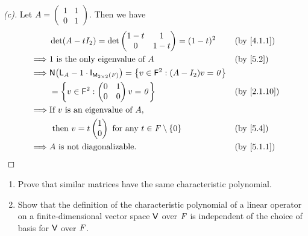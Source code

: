 \begin{proof}[(c)]
  Let \(A = \begin{pmatrix}
    1 & 1 \\
    0 & 1
  \end{pmatrix}\).
  Then we have
  \begin{align*}
             & \det(A - t I_2) = \det\begin{pmatrix}
                                       1 - t & 1     \\
                                       0     & 1 - t
                                     \end{pmatrix} = (1 - t)^2                                             &  & \by{4.1.1}         \\
    \implies & 1 \text{ is the only eigenvalue of } A                                            &  & \by{5.2}                     \\
    \implies & \ns{\L_A - 1 \cdot \IT[\ms[2][2][\F]]} = \set{v \in \vs{F}^2 : (A - I_2) v = \zv}                                   \\
             & = \set{v \in \vs{F}^2 : \begin{pmatrix}
                                           0 & 1 \\
                                           0 & 0
                                         \end{pmatrix} v = \zv}                                           &  & \by{2.1.10}           \\
    \implies & \text{If } v \text{ is an eigenvalue of } A,                                                                        \\
             & \text{ then } v = t \begin{pmatrix}
                                     1 \\
                                     0
                                   \end{pmatrix} \text{ for any } t \in \F \setminus \set{0}                         &  & \by{5.4} \\
    \implies & A \text{ is not diagonalizable}.                                                  &  & \by{5.1.1}
  \end{align*}
\end{proof}

\begin{ex}\label{ex:5.1.12}
  \begin{enumerate}
    \item Prove that similar matrices have the same characteristic polynomial.
    \item Show that the definition of the characteristic polynomial of a linear operator on a finite-dimensional vector space \(\mathsf{V}\) over \(\mathit{F}\) is independent of the choice of basis for \(\mathsf{V}\) over \(\mathit{F}\).
  \end{enumerate}
\end{ex}

